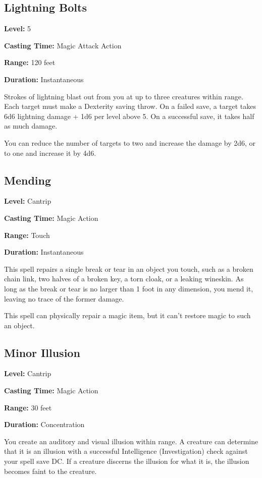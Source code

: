 \documentclass[12pt,letterpaper,twocolumn,openany,nodeprecatedcode,bg=none]{dndbook}
\begin{document}
\subsection{Lightning Bolts}\label{lightning-bolts}

\textbf{Level:} 5

\textbf{Casting Time:} Magic Attack Action

\textbf{Range:} 120 feet

\textbf{Duration:} Instantaneous

Strokes of lightning blast out from you at up to three creatures within
range. Each target must make a Dexterity saving throw. On a failed save,
a target takes 6d6 lightning damage + 1d6 per level above 5. On a
successful save, it takes half as much damage.

You can reduce the number of targets to two and increase the damage by
2d6, or to one and increase it by 4d6.

\subsection{Mending}\label{mending}

\textbf{Level:} Cantrip

\textbf{Casting Time:} Magic Action

\textbf{Range:} Touch

\textbf{Duration:} Instantaneous

This spell repairs a single break or tear in an object you touch, such
as a broken chain link, two halves of a broken key, a torn cloak, or a
leaking wineskin. As long as the break or tear is no larger than 1 foot
in any dimension, you mend it, leaving no trace of the former damage.

This spell can physically repair a magic item, but it can't restore
magic to such an object.

\clearpage

\subsection{Minor Illusion}\label{minor-illusion}

\textbf{Level:} Cantrip

\textbf{Casting Time:} Magic Action

\textbf{Range:} 30 feet

\textbf{Duration:} Concentration

You create an auditory and visual illusion within range. A creature can
determine that it is an illusion with a successful Intelligence
(Investigation) check against your spell save DC. If a creature discerns
the illusion for what it is, the illusion becomes faint to the creature.
\end{document}
